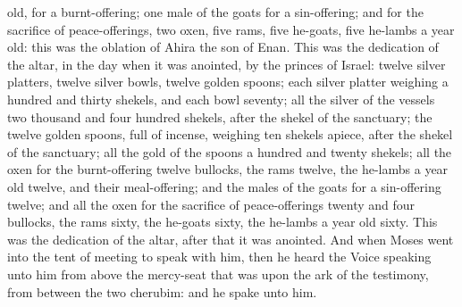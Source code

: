 old, for a burnt-offering; one male of the goats for a sin-offering; and for the sacrifice of peace-offerings, two oxen, five rams, five he-goats, five he-lambs a year old: this was the oblation of Ahira the son of Enan.  This was the dedication of the altar, in the day when it was anointed, by the princes of Israel: twelve silver platters, twelve silver bowls, twelve golden spoons; each silver platter weighing a hundred and thirty shekels, and each bowl seventy; all the silver of the vessels two thousand and four hundred shekels, after the shekel of the sanctuary; the twelve golden spoons, full of incense, weighing ten shekels apiece, after the shekel of the sanctuary; all the gold of the spoons a hundred and twenty shekels; all the oxen for the burnt-offering twelve bullocks, the rams twelve, the he-lambs a year old twelve, and their meal-offering; and the males of the goats for a sin-offering twelve; and all the oxen for the sacrifice of peace-offerings twenty and four bullocks, the rams sixty, the he-goats sixty, the he-lambs a year old sixty. This was the dedication of the altar, after that it was anointed.  And when Moses went into the tent of meeting to speak with him, then he heard the Voice speaking unto him from above the mercy-seat that was upon the ark of the testimony, from between the two cherubim: and he spake unto him. 

